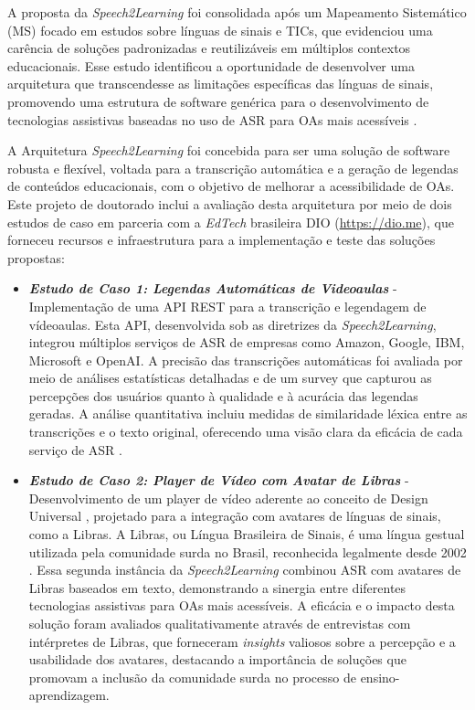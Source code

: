 A proposta da \textit{Speech2Learning} foi consolidada após um Mapeamento Sistemático (MS) focado em estudos sobre línguas de sinais e TICs, que evidenciou uma carência de soluções padronizadas e reutilizáveis em múltiplos contextos educacionais. Esse estudo identificou a oportunidade de desenvolver uma arquitetura que transcendesse as limitações específicas das línguas de sinais, promovendo uma estrutura de software genérica para o desenvolvimento de tecnologias assistivas baseadas no uso de ASR para OAs mais acessíveis \cite{FalvoJr2020_FIE, FalvoJr2020_SBIE, FalvoJr2020_RENOTE}.

A Arquitetura \textit{Speech2Learning} foi concebida para ser uma solução de software robusta e flexível, voltada para a transcrição automática e a geração de legendas de conteúdos educacionais, com o objetivo de melhorar a acessibilidade de OAs. Este projeto de doutorado inclui a avaliação desta arquitetura por meio de dois estudos de caso em parceria com a \textit{EdTech} brasileira DIO (\url{https://dio.me}), que forneceu recursos e infraestrutura para a implementação e teste das soluções propostas:

\begin{itemize}
\item \textbf{\textit{Estudo de Caso 1: Legendas Automáticas de Videoaulas}} - Implementação de uma API REST para a transcrição e legendagem de vídeoaulas. Esta API, desenvolvida sob as diretrizes da \textit{Speech2Learning}, integrou múltiplos serviços de ASR de empresas como Amazon, Google, IBM, Microsoft e OpenAI. A precisão das transcrições automáticas foi avaliada por meio de análises estatísticas detalhadas e de um survey que capturou as percepções dos usuários quanto à qualidade e à acurácia das legendas geradas. A análise quantitativa incluiu medidas de similaridade léxica entre as transcrições e o texto original, oferecendo uma visão clara da eficácia de cada serviço de ASR \cite{FalvoJr2023_HICSS}.

\item \textbf{\textit{Estudo de Caso 2: Player de Vídeo com Avatar de Libras}} - Desenvolvimento de um player de vídeo aderente ao conceito de Design Universal \cite{GovBr2023}, projetado para a integração com avatares de línguas de sinais, como a Libras. A Libras, ou Língua Brasileira de Sinais, é uma língua gestual utilizada pela comunidade surda no Brasil, reconhecida legalmente desde 2002 \cite{Quadros2019, Honora2017}. Essa segunda instância da \textit{Speech2Learning} combinou ASR com avatares de Libras baseados em texto, demonstrando a sinergia entre diferentes tecnologias assistivas para OAs mais acessíveis. A eficácia e o impacto desta solução foram avaliados qualitativamente através de entrevistas com intérpretes de Libras, que forneceram \textit{insights} valiosos sobre a percepção e a usabilidade dos avatares, destacando a importância de soluções que promovam a inclusão da comunidade surda no processo de ensino-aprendizagem.
\end{itemize}

